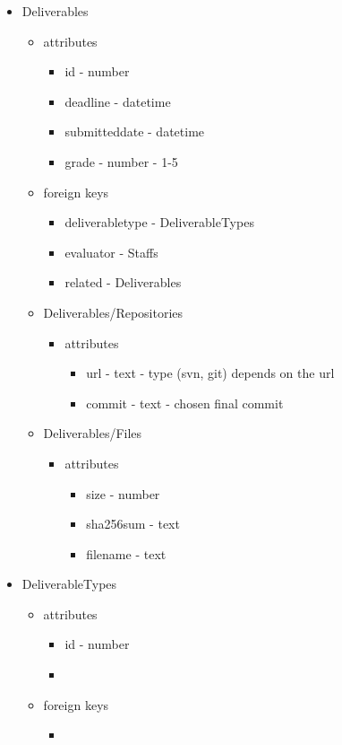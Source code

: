 \begin{itemize}
	\item Deliverables
	\begin{itemize}
		\item attributes
		\begin{itemize}
			\item id - number
			\item deadline - datetime
			\item submitteddate - datetime
			\item grade - number - 1-5
		\end{itemize}
		\item foreign keys
		\begin{itemize}
			\item deliverabletype - DeliverableTypes
			\item evaluator - Staffs
			\item related - Deliverables
		\end{itemize}
		\item Deliverables/Repositories
		\begin{itemize}
			\item attributes
			\begin{itemize}
				\item url - text - type (svn, git) depends on the url
				\item commit - text - chosen final commit
			\end{itemize}
		\end{itemize}
		\item Deliverables/Files
		\begin{itemize}
			\item attributes
			\begin{itemize}
				\item size - number
				\item sha256sum - text
				\item filename - text
			\end{itemize}
		\end{itemize}
	\end{itemize}
	
	\item DeliverableTypes
	\begin{itemize}
		\item attributes
		\begin{itemize}
			\item id - number
			\item \todo{}
		\end{itemize}
		\item foreign keys
		\begin{itemize}
			\item \todo{}
		\end{itemize}
	\end{itemize}
	

\end{itemize}
